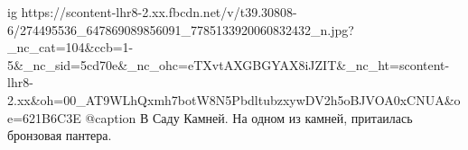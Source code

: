  
 
 
 
 

\ifcmt
  ig https://scontent-lhr8-2.xx.fbcdn.net/v/t39.30808-6/274495536_647869089856091_7785133920060832432_n.jpg?_nc_cat=104&ccb=1-5&_nc_sid=5cd70e&_nc_ohc=eTXvtAXGBGYAX8iJZIT&_nc_ht=scontent-lhr8-2.xx&oh=00_AT9WLhQxmh7botW8N5PbdltubzxywDV2h5oBJVOA0xCNUA&oe=621B6C3E
	@caption В Саду Камней. На одном из камней, притаилась бронзовая пантера.
\fi

